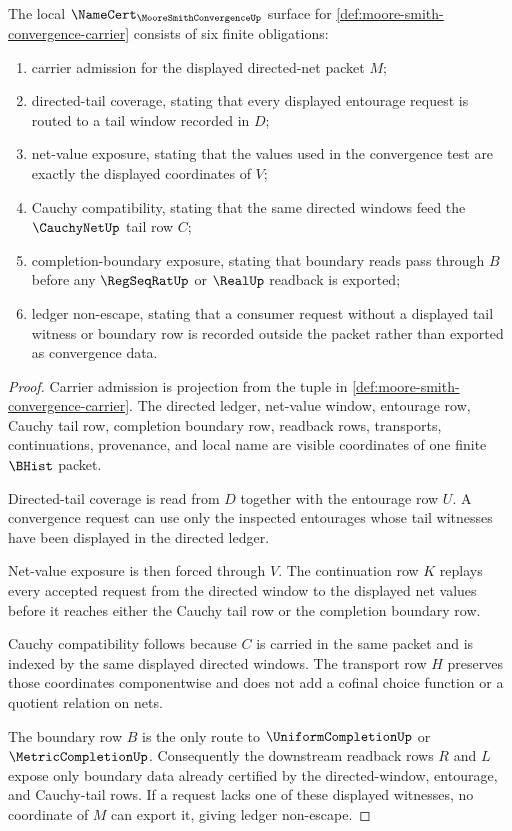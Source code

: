 \begin{theorem}
\label{thm:moore-smith-convergence-namecert-obligations}
The local $\NameCert_{\MooreSmithConvergenceUp}$ surface for \autoref{def:moore-smith-convergence-carrier} consists of six finite obligations:
\begin{enumerate}
\item carrier admission for the displayed directed-net packet $M$;
\item directed-tail coverage, stating that every displayed entourage request is routed to a tail window recorded in $D$;
\item net-value exposure, stating that the values used in the convergence test are exactly the displayed coordinates of $V$;
\item Cauchy compatibility, stating that the same directed windows feed the $\CauchyNetUp$ tail row $C$;
\item completion-boundary exposure, stating that boundary reads pass through $B$ before any $\RegSeqRatUp$ or $\RealUp$ readback is exported;
\item ledger non-escape, stating that a consumer request without a displayed tail witness or boundary row is recorded outside the packet rather than exported as convergence data.
\end{enumerate}
\end{theorem}
\begin{proof}
Carrier admission is projection from the tuple in \autoref{def:moore-smith-convergence-carrier}. The directed ledger, net-value window, entourage row, Cauchy tail row, completion boundary row, readback rows, transports, continuations, provenance, and local name are visible coordinates of one finite $\BHist$ packet.

Directed-tail coverage is read from $D$ together with the entourage row $U$. A convergence request can use only the inspected entourages whose tail witnesses have been displayed in the directed ledger.

Net-value exposure is then forced through $V$. The continuation row $K$ replays every accepted request from the directed window to the displayed net values before it reaches either the Cauchy tail row or the completion boundary row.

Cauchy compatibility follows because $C$ is carried in the same packet and is indexed by the same displayed directed windows. The transport row $H$ preserves those coordinates componentwise and does not add a cofinal choice function or a quotient relation on nets.

The boundary row $B$ is the only route to $\UniformCompletionUp$ or $\MetricCompletionUp$. Consequently the downstream readback rows $R$ and $L$ expose only boundary data already certified by the directed-window, entourage, and Cauchy-tail rows. If a request lacks one of these displayed witnesses, no coordinate of $M$ can export it, giving ledger non-escape.
\end{proof}

